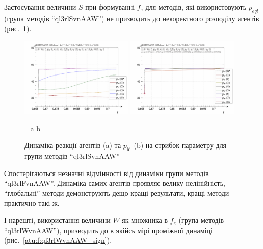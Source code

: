 Застосування величини
$ S $ при формуванні
$ f_e $ для методів, які використовують
$ p_{eql} $ (група методів ``ql3rlSvnAAW'') не призводить до некоректного
розподілу агентів (рис.~\ref{atu:f:ql3rlSvnAAW_sign}).


\begin{figure}[htb!]
  \begin{center}
    \includegraphics[width=0.48\textwidth]{p/sign/qls-p_t_pi_m_ql3rlSvnAAW_sign.png}
    \hfill
    \includegraphics[width=0.48\textwidth]{p/sign/qls-p_t_p_m_ql3rlSvnAAW_sign.png}
  \end{center}
  \vspace{-1.0ex}
  \begin{center}
    ~ \hfill a \hfill\hfill b  \hfill ~
  \end{center}
  \vspace{-1.5ex}
  \caption{Динаміка реакції агентів (a) та $p_\mathrm{id}$ (b) на стрибок параметру для групи методів ``ql3rlSvnAAW''}
  \label{atu:f:ql3rlSvnAAW_sign}
\end{figure}

Спостерігаються незначні відмінності від динаміки групи
методів ``ql3rlFvnAAW''. Динаміка самих агентів проявляє велику
нелінійність, ``глобальні'' методи демонструють дещо кращі
результати, кращі методи --- практично такі ж.

І нарешті, використання величини
$ W $ як множника в
$ f_e $ (група методів ``ql3rlWvnAAW''), призводить до в якійсь мірі
проміжної динаміці (рис.~\ref{atu:f:ql3rlWvnAAW_sign}).

